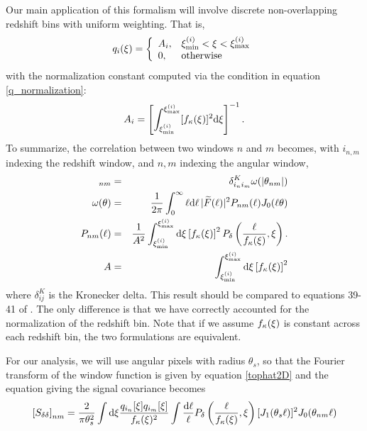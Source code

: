 Our main application of this formalism will involve discrete 
non-overlapping redshift bins with uniform weighting.  That is,
\begin{equation}
  q_i(\xi) = \left\{
  \begin{array}{ll}
    A_i, & \xi^{(i)}_{\mathrm{min}} 
    < \xi < \xi^{(i)}_{\mathrm{max}}\\
    0, & \mathrm{otherwise}
  \end{array}
  \right.
\end{equation}
with the normalization constant computed via the condition in equation 
\ref{q_normalization}:
\begin{equation}
  A_i = \left[\int_{\xi^{(i)}_{\mathrm{min}}}^{\xi^{(i)}_{\mathrm{max}}}
  [f_\kappa(\xi)]^2 \mathrm{d}\xi\right]^{-1}.
\end{equation}
To summarize, the correlation between two windows $n$ 
and $m$ becomes, with $i_{n,m}$
indexing the redshift window, and $n,m$ indexing the angular window,
\begin{eqnarray}
  [S_{\delta\delta}]_{nm} 
  &=& \delta^K_{i_ni_m}\omega(|\theta_{nm}|)\nonumber\\
  \omega(\theta)
  &=&\frac{1}{2\pi}\int_0^\infty\ell\dd\ell\, 
  |\widetilde{F}(\ell)|^2
  P_{nm}(\ell)J_0(\ell\theta)\nonumber\\
  P_{nm}(\ell) &=& 
  \frac{1}{A^2}
  \int_{\rcom^{(i)}_\mathrm{min}}^{\rcom^{(i)}_\mathrm{max}} 
  \dd\rcom \left[f_\kappa(\rcom)\right]^2
  P_\delta\left(\frac{\ell}{f_\kappa(\rcom)},\rcom\right).\nonumber\\
  A &=& \int_{\rcom^{(i)}_\mathrm{min}}^{\rcom^{(i)}_\mathrm{max}} 
  \dd\rcom \left[f_\kappa(\rcom)\right]^2
\end{eqnarray} 
where $\delta^K_{ij}$ is the Kronecker delta. This result should be 
compared  to equations 39-41 of \citet{Simon09}.  The only difference is
that we have correctly accounted for the normalization of the redshift
bin.  Note that if we assume $f_\kappa(\xi)$ is constant across
each redshift bin, the two formulations are equivalent.

For our analysis, we will use angular pixels with radius $\theta_s$, 
so that the Fourier transform of the window function is given by equation 
\ref{tophat2D} and the equation giving the signal covariance becomes
\begin{equation}
  \left[S_{\delta\delta}\right]_{nm}
  = \frac{2}{\pi\theta_s^2} 
  \int \mathrm{d}\xi \frac{q_{i_n}[\xi]q_{i_m}[\xi]}
  {f_\kappa(\xi)^2} 
  \int  \frac{\mathrm{d}\ell}{\ell}
  P_\delta\left(\frac{\ell}{f_\kappa(\xi)},\xi\right)
  [J_1(\theta_s\ell)]^2 J_0(\theta_{nm}\ell)
\end{equation}

